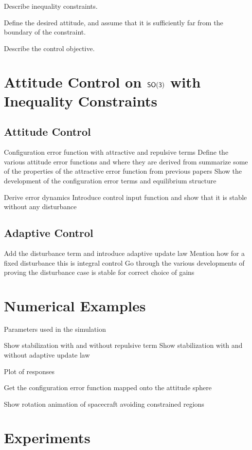 \documentclass[letterpaper, 10 pt, conference]{ieeeconf}  %
\begin{document}
Describe inequality constraints. 

Define the desired attitude, and assume that it is sufficiently far from the boundary of the constraint. 

Describe the control objective. 


\section{Attitude Control on $\mathsf{SO(3)}$ with Inequality Constraints}


\subsection{Attitude Control}

Configuration error function with attractive and repulsive terms
Define the various attitude error functions and where they are derived from
summarize some of the properties of the attractive error function from previous papers
Show the development of the configuration error terms and equilibrium structure


Derive error dynamics
Introduce control input function and show that it is stable without any disturbance


\subsection{Adaptive Control}

Add the disturbance term and introduce adaptive update law
Mention how for a fixed disturbance this is integral control 
Go through the various developments of proving the disturbance case is stable for correct choice of gains

\section{Numerical Examples}
Parameters used in the simulation

Show stabilization with and without repulsive term
Show stabilization with and without adaptive update law

Plot of responses

Get the configuration error function mapped onto the attitude sphere

Show rotation animation of spacecraft avoiding constrained regions

\section{Experiments}
\end{document}
